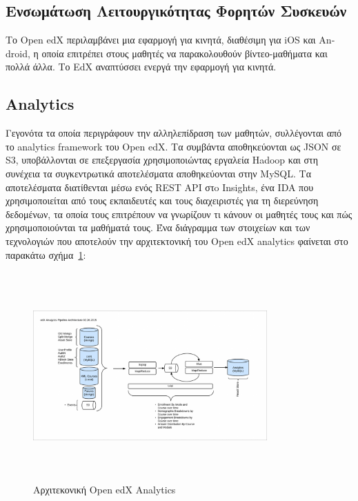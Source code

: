 \documentclass[12pt]{report}
\begin{document}
\subsection{Ενσωμάτωση Λειτουργικότητας Φορητών Συσκευών} Το \textlatin{Open edX} περιλαμβάνει μια εφαρμογή για κινητά, διαθέσιμη για \textlatin{iOS} και \textlatin{Android}, η οποία επιτρέπει στους μαθητές να παρακολουθούν βίντεο-μαθήματα και πολλά άλλα. Το \textlatin{EdX} αναπτύσσει ενεργά την εφαρμογή για κινητά.

\subsection{\textlatin{Analytics}}
Γεγονότα τα οποία περιγράφουν την αλληλεπίδραση των μαθητών, συλλέγονται από το \textlatin{analytics framework} του \textlatin{Open edX}. Τα συμβάντα αποθηκεύονται ως \textlatin{JSON} σε \textlatin{S3}, υποβάλλονται σε επεξεργασία χρησιμοποιώντας εργαλεία \textlatin{Hadoop} και στη συνέχεια τα συγκεντρωτικά αποτελέσματα αποθηκεύονται στην \textlatin{MySQL}. Τα αποτελέσματα διατίθενται μέσω ενός \textlatin{REST API} στo \textlatin{Insights}, ένα \textlatin{IDA} που χρησιμοποιείται από τους εκπαιδευτές και τους διαχειριστές για τη διερεύνηση δεδομένων, τα οποία τους επιτρέπουν να γνωρίζουν τι κάνουν οι μαθητές τους και πώς χρησιμοποιούνται τα μαθήματά τους. Ένα διάγραμμα των στοιχείων και των τεχνολογιών που αποτελούν την αρχιτεκτονική του \textlatin{Open edX analytics} φαίνεται στο παρακάτω σχήμα~\ref{fig:edx_analytics_arch}:
\begin{figure}[!htbp]
\centering
\includegraphics[width=0.8\textwidth, height=8cm]{edx-architecture-analytics}
\caption{Αρχιτεκονική \textlatin{Open edX Analytics}}
\label{fig:edx_analytics_arch}
\end{figure}
\end{document}
